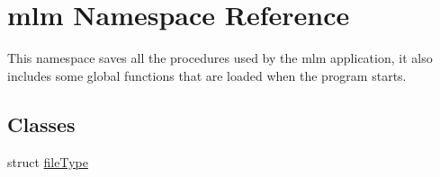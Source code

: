 \hypertarget{namespacemlm}{}\section{mlm Namespace Reference}
\label{namespacemlm}


This namespace saves all the procedures used by the mlm application, it also includes some global functions that are loaded when the program starts.  


\subsection*{Classes}
\begin{DoxyCompactItemize}
\item 
struct \mbox{\hyperlink{structmlm_1_1fileType}{file\+Type}}
\end{DoxyCompactItemize}
